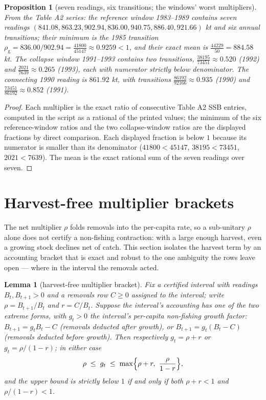 \documentclass[10pt,twocolumn]{article}
\theoremstyle{plain}
\newtheorem{lemma}[theorem]{Lemma}
\newtheorem{proposition}[theorem]{Proposition}
\theoremstyle{remark}
\begin{document}
\begin{proposition}[seven readings, six transitions; the windows'
worst multipliers]
\label{prop:windows}
From the Table A2 series: the reference window 1983--1989 contains
seven readings \((841.08, 863.23, 902.94, 836.00, 940.75, 886.40,
921.66)\) kt and six annual transitions; their minimum is the 1985
transition \(\rho_{\mathrm{g}} = 836.00/902.94 =
\tfrac{41800}{45147} \approx 0.9259 < 1\), and their exact mean is
\(\tfrac{44229}{50} = 884.58\) kt. The collapse window 1991--1993
contains two transitions,
\(\tfrac{38195}{73451} \approx 0.520\) (1992) and
\(\tfrac{2021}{7639} \approx 0.265\) (1993), each with numerator
strictly below denominator. The connecting 1990 reading is
\(861.92\) kt, with transitions
\(\tfrac{86192}{92166} \approx 0.935\) (1990) and
\(\tfrac{73451}{86192} \approx 0.852\) (1991).
\end{proposition}

\begin{proof}
Each multiplier is the exact ratio of consecutive Table A2 SSB entries,
computed in the script as a rational of the printed values; the
minimum of the six reference-window ratios and the two collapse-window
ratios are the displayed fractions by direct comparison. Each
displayed fraction is below \(1\) because its numerator is smaller
than its denominator (\(41800 < 45147\), \(38195 < 73451\),
\(2021 < 7639\)). The mean is the exact rational sum of the seven
readings over seven.
\end{proof}

\section{Harvest-free multiplier brackets}\label{brackets}

The net multiplier \(\rho\) folds removals into the per-capita rate,
so a sub-unitary \(\rho\) alone does not certify a non-fishing
contraction: with a large enough harvest, even a growing stock
declines net of catch. This section isolates the harvest term by an
accounting bracket that is exact and robust to the one ambiguity the
rows leave open --- where in the interval the removals acted.

\begin{lemma}[harvest-free multiplier bracket]\label{lem:bracket}
Fix a certified interval with readings \(B_t, B_{t+1} > 0\) and a
removals row \(C \ge 0\) assigned to the interval; write
\(\rho = B_{t+1}/B_t\) and \(r = C/B_t\). Suppose the interval's
accounting has one of the two extreme forms, with \(g_t > 0\) the
interval's per-capita non-fishing growth factor:
\(B_{t+1} = g_t B_t - C\) (removals deducted after growth), or
\(B_{t+1} = g_t (B_t - C)\) (removals deducted before growth). Then
respectively \(g_t = \rho + r\) or \(g_t = \rho/(1-r)\); in either
case
\[
\rho \;\le\; g_t \;\le\; \max\Bigl\{\rho + r,\ \frac{\rho}{1-r}\Bigr\},
\]
and the upper bound is strictly below \(1\) if and only if both
\(\rho + r < 1\) and \(\rho/(1-r) < 1\).
\end{lemma}
\end{document}
